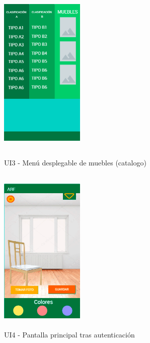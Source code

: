 \begin{figure}[h!]
	\begin{minipage}{0.48\textwidth}
		\centering
		\includegraphics[width=4cm,height=8cm]{imagenes/Anexos/Mockup/3-MenuMuebles.png}
		\caption{UI3 - Menú desplegable de muebles (catalogo)}
		\label{fig:analogo}
	\end{minipage}\hfill
	\begin{minipage}{0.48\textwidth}
		\centering
		\includegraphics[width=4cm,height=8cm]{imagenes/Anexos/Mockup/4-principalLogin.png}
		\caption{UI4 - Pantalla principal tras autenticación}
		\label{fig:analogo}
	\end{minipage}\hfill
\end{figure}

